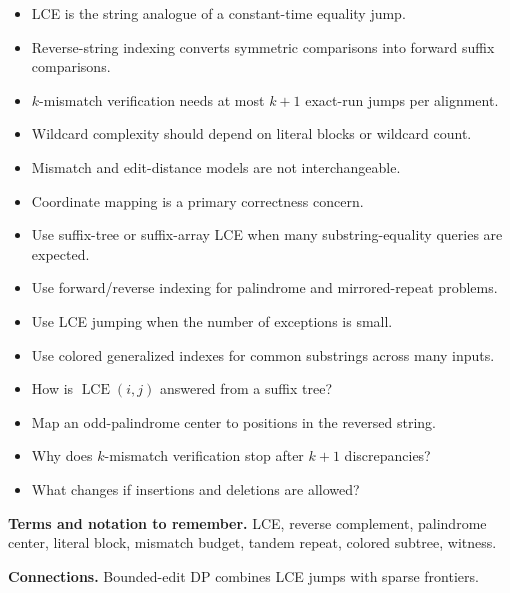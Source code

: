 \documentclass[11pt]{article}
\begin{document}
\begin{tcolorbox}[enhanced,breakable,title={Key takeaways},
  colback=white,colframe=Primary,fonttitle=\small\sffamily\bfseries,fontupper=\footnotesize,
  boxsep=0.6mm,left=1.5mm,right=1.5mm,top=1mm,bottom=1mm,before skip=3pt,after skip=3pt]
\begin{itemize}
  \item LCE is the string analogue of a constant-time equality jump.
  \item Reverse-string indexing converts symmetric comparisons into forward suffix comparisons.
  \item $k$-mismatch verification needs at most $k+1$ exact-run jumps per alignment.
  \item Wildcard complexity should depend on literal blocks or wildcard count.
  \item Mismatch and edit-distance models are not interchangeable.
  \item Coordinate mapping is a primary correctness concern.
\end{itemize}
\end{tcolorbox}

\begin{tcolorbox}[enhanced,breakable,title={Algorithm selection / when to use this},
  colback=Primary!3,colframe=Primary,fonttitle=\small\sffamily\bfseries,fontupper=\footnotesize,
  boxsep=0.6mm,left=1.5mm,right=1.5mm,top=1mm,bottom=1mm,before skip=3pt,after skip=3pt]
\begin{itemize}
  \item Use suffix-tree or suffix-array LCE when many substring-equality queries are expected.
  \item Use forward/reverse indexing for palindrome and mirrored-repeat problems.
  \item Use LCE jumping when the number of exceptions is small.
  \item Use colored generalized indexes for common substrings across many inputs.
\end{itemize}
\end{tcolorbox}

\begin{tcolorbox}[enhanced,breakable,title={Self-test questions},
  colback=white,colframe=Accent,fonttitle=\small\sffamily\bfseries,fontupper=\footnotesize,
  boxsep=0.6mm,left=1.5mm,right=1.5mm,top=1mm,bottom=1mm,before skip=3pt,after skip=3pt]
\begin{itemize}
  \item How is $\operatorname{LCE}(i,j)$ answered from a suffix tree?
  \item Map an odd-palindrome center to positions in the reversed string.
  \item Why does $k$-mismatch verification stop after $k+1$ discrepancies?
  \item What changes if insertions and deletions are allowed?
\end{itemize}
\end{tcolorbox}

{\footnotesize
\textbf{Terms and notation to remember.} LCE, reverse complement, palindrome center, literal block, mismatch budget, tandem repeat, colored subtree, witness.

\textbf{Connections.} Bounded-edit DP combines LCE jumps with sparse frontiers.
}
\end{document}
